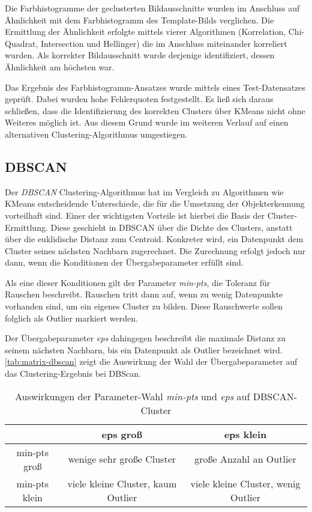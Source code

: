 \documentclass[
    type=Projektarbeit,
    status=draft, %
    language=german, %
    bibengine=bibtex,
]{unibwm-inf-thesis}
\begin{document}
    Die Farbhistogramme der geclusterten Bildausschnitte wurden im Anschluss auf Ähnlichkeit mit dem Farbhistogramm des Template-Bilds verglichen.
    Die Ermittlung der Ähnlichkeit erfolgte mittels vierer Algorithmen (Korrelation, Chi-Quadrat, Intersection und Hellinger) die im Anschluss miteinander korreliert wurden.
    Als korrekter Bildausschnitt wurde derjenige identifiziert, dessen Ähnlichkeit am höchsten war.

    Das Ergebnis des Farbhistogramm-Ansatzes wurde mittels eines Test-Datensatzes geprüft.
    Dabei wurden hohe Fehlerquoten festgestellt.
    Es ließ sich daraus schließen, dass die Identifizierung des korrekten Clusters über KMeans nicht ohne Weiteres möglich ist.
    Aus diesem Grund wurde im weiteren Verlauf auf einen alternativen Clustering-Algorithmus umgestiegen.

    \subsection{DBSCAN}\label{subsec:dbscan}
    Der \textit{DBSCAN} Clustering-Algorithmus hat im Vergleich zu Algorithmen wie KMeans entscheidende Unterschiede, die für die Umsetzung der Objekterkennung vorteilhaft sind.
    Einer der wichtigsten Vorteile ist hierbei die Basis der Cluster-Ermittlung.
    Diese geschieht in DBSCAN über die Dichte des Clusters, anstatt über die euklidische Distanz zum Centroid.
    Konkreter wird, ein Datenpunkt dem Cluster seines nächsten Nachbarn zugerechnet.
    Die Zurechnung erfolgt jedoch nur dann, wenn die Konditionen der Übergabeparameter erfüllt sind.

    Als eine dieser Konditionen gilt der Parameter \textit{min-pts}, die Toleranz für Rauschen beschreibt.
    Rauschen tritt dann auf, wenn zu wenig Datenpunkte vorhanden sind, um ein eigenes Cluster zu bilden.
    Diese Rauschwerte sollen folglich als Outlier markiert werden.

    Der Übergabeparameter \textit{eps} dahingegen beschreibt die maximale Distanz zu seinem nächsten Nachbarn, bis ein Datenpunkt als Outlier bezeichnet wird.
    \autoref{tab:matrix-dbscan} zeigt die Auswirkung der Wahl der Übergabeparameter auf das Clustering-Ergebnis bei DBScan.
    \begin{table}[h]
        \centering
        \begin{tabular}{c | c | c}
            & eps groß & eps klein \\ \hline
            min-pts groß & wenige sehr große Cluster & große Anzahl an Outlier\\ \hline
            min-pts klein & viele kleine Cluster, kaum Outlier & viele kleine Cluster, wenig Outlier
        \end{tabular}
        \caption{Auswirkungen der Parameter-Wahl \textit{min-pts} und \textit{eps} auf DBSCAN-Cluster}
        \label{tab:matrix-dbscan}
    \end{table}
\end{document}
